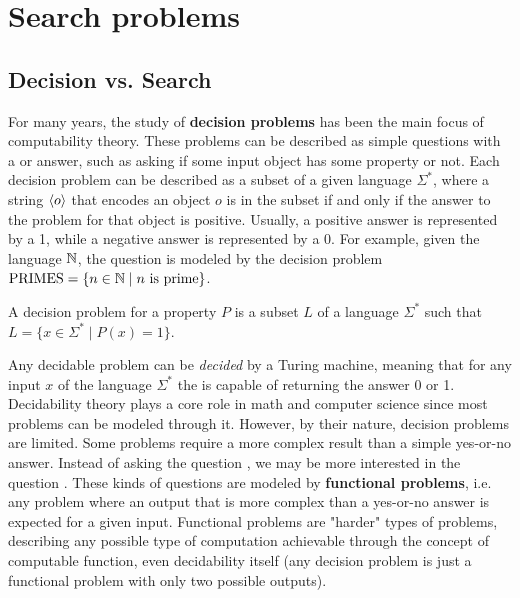 
\chapter{Search problems} \label{chap:search_problems}

\section{Decision vs. Search}

For many years, the study of \textbf{decision problems} has been the main focus of computability theory. These problems can be described as simple questions with a  or  answer, such as asking if some input object has some property or not. Each decision problem can be described as a subset of a given language $\Sigma^*$, where a string $\left\langle o\right\rangle$ that encodes an object $o$ is in the subset if and only if the answer to the problem for that object is positive. Usually, a positive  answer is represented by a 1, while a negative  answer is represented by a 0. For example, given the language $\mathbb{N}$, the question  is modeled by the decision problem $\mathrm{PRIMES} = \{n \in \mathbb{N} \mid n \text{ is prime}\}$.

\begin{definition}
 A decision problem for a property $P$ is a subset $L$ of a language $\Sigma^*$ such that $L = \{x \in \Sigma^* \mid P(x) = 1\}$.
\end{definition}

Any decidable problem can be \textit{decided} by a Turing machine, meaning that for any input $x$ of the language $\Sigma^*$ the \TM is capable of returning the answer 0 or 1. Decidability theory plays a core role in math and computer science since most problems can be modeled through it. However, by their nature, decision problems are limited. Some problems require a more complex result than a simple yes-or-no answer. Instead of asking the question , we may be more interested in the question . These kinds of questions are modeled by \textbf{functional problems}, i.e. any problem where an output that is more complex than a yes-or-no answer is expected for a given input. Functional problems are "harder" types of problems, describing any possible type of computation achievable through the concept of computable function, even decidability itself (any decision problem is just a functional problem with only two possible outputs).

